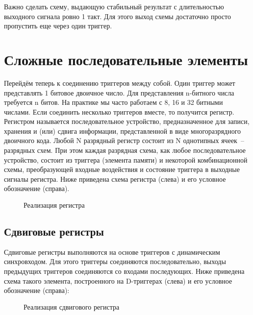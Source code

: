 Важно сделать схему, выдающую стабильный результат с длительностью выходного сигнала ровно 1 такт. Для этого выход схемы достаточно просто пропустить еще через один триггер.

\section{Сложные последовательные элементы}

Перейдём теперь к соединению триггеров между собой. Один триггер может представлять 1 битовое двоичное число. Для представления n-битного числа требуется n битов. На практике мы часто работаем с 8, 16 и 32 битными числами. Если соединить несколько триггеров вместе, то получится регистр. Регистром называется последовательное устройство, предназначенное для записи, хранения и (или) сдвига информации, представленной в виде многоразрядного двоичного кода. Любой N разрядный регистр состоит из N однотипных ячеек~-- разрядных схем. При этом каждая разрядная схема, как любое последовательное устройство, состоит из триггера (элемента памяти) и некоторой комбинационной схемы, преобразующей входные воздействия и состояние триггера в выходные сигналы регистра. Ниже приведена схема регистра (слева) и его условное обозначение (справа).

\begin{figure}[ht]
\centering
{}
\caption{Реализация регистра}
\label{register_arch}
\end{figure}

\subsection{Сдвиговые регистры}

Сдвиговые регистры выполняются на основе триггеров с динамическим синхровходом. Для этого триггеры соединяются последовательно, выходы предыдущих триггеров соединяются со входами последующих. Ниже приведена схема такого элемента, построенного на D-триггерах (слева) и его условное обозначение (справа):

\begin{figure}[ht]
\centering
{}
\caption{Реализация сдвигового регистра}
\label{shift_register_arch}
\end{figure}
 
